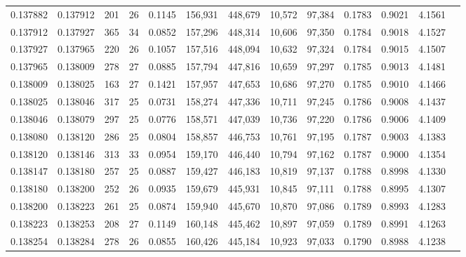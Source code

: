 \begin{tabular}{rrrrrrrrrrrrr}
0.137882 & 0.137912 & 201 &  26 &                                     0.1145 & 156,931 & 448,679 &  10,572 &  97,384 & 0.1783 & 0.9021 & 4.1561 \\
0.137912 & 0.137927 & 365 &  34 &                                     0.0852 & 157,296 & 448,314 &  10,606 &  97,350 & 0.1784 & 0.9018 & 4.1527 \\
0.137927 & 0.137965 & 220 &  26 &                                     0.1057 & 157,516 & 448,094 &  10,632 &  97,324 & 0.1784 & 0.9015 & 4.1507 \\
0.137965 & 0.138009 & 278 &  27 &                                     0.0885 & 157,794 & 447,816 &  10,659 &  97,297 & 0.1785 & 0.9013 & 4.1481 \\
0.138009 & 0.138025 & 163 &  27 &                                     0.1421 & 157,957 & 447,653 &  10,686 &  97,270 & 0.1785 & 0.9010 & 4.1466 \\
0.138025 & 0.138046 & 317 &  25 &                                     0.0731 & 158,274 & 447,336 &  10,711 &  97,245 & 0.1786 & 0.9008 & 4.1437 \\
0.138046 & 0.138079 & 297 &  25 &                                     0.0776 & 158,571 & 447,039 &  10,736 &  97,220 & 0.1786 & 0.9006 & 4.1409 \\
0.138080 & 0.138120 & 286 &  25 &                                     0.0804 & 158,857 & 446,753 &  10,761 &  97,195 & 0.1787 & 0.9003 & 4.1383 \\
0.138120 & 0.138146 & 313 &  33 &                                     0.0954 & 159,170 & 446,440 &  10,794 &  97,162 & 0.1787 & 0.9000 & 4.1354 \\
0.138147 & 0.138180 & 257 &  25 &                                     0.0887 & 159,427 & 446,183 &  10,819 &  97,137 & 0.1788 & 0.8998 & 4.1330 \\
0.138180 & 0.138200 & 252 &  26 &                                     0.0935 & 159,679 & 445,931 &  10,845 &  97,111 & 0.1788 & 0.8995 & 4.1307 \\
0.138200 & 0.138223 & 261 &  25 &                                     0.0874 & 159,940 & 445,670 &  10,870 &  97,086 & 0.1789 & 0.8993 & 4.1283 \\
0.138223 & 0.138253 & 208 &  27 &                                     0.1149 & 160,148 & 445,462 &  10,897 &  97,059 & 0.1789 & 0.8991 & 4.1263 \\
0.138254 & 0.138284 & 278 &  26 &                                     0.0855 & 160,426 & 445,184 &  10,923 &  97,033 & 0.1790 & 0.8988 & 4.1238 \\

\end{tabular}
